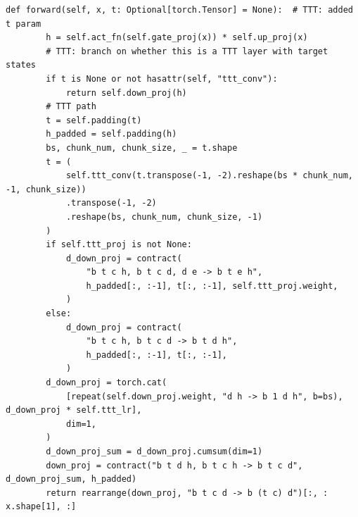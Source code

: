 \begin{lstlisting}[caption={Excerpt from \texttt{repos/\allowbreak{}ByteDance-Seed\_\_In-Place-TTT/\allowbreak{}hf\_models/\allowbreak{}hf\_qwen3/\allowbreak{}modeling\_qwen3.py} (\texttt{Qwen3MLP.forward})},label={lst:c09-inplace-code}]
    def forward(self, x, t: Optional[torch.Tensor] = None):  # TTT: added t param
        h = self.act_fn(self.gate_proj(x)) * self.up_proj(x)
        # TTT: branch on whether this is a TTT layer with target states
        if t is None or not hasattr(self, "ttt_conv"):
            return self.down_proj(h)
        # TTT path
        t = self.padding(t)
        h_padded = self.padding(h)
        bs, chunk_num, chunk_size, _ = t.shape
        t = (
            self.ttt_conv(t.transpose(-1, -2).reshape(bs * chunk_num, -1, chunk_size))
            .transpose(-1, -2)
            .reshape(bs, chunk_num, chunk_size, -1)
        )
        if self.ttt_proj is not None:
            d_down_proj = contract(
                "b t c h, b t c d, d e -> b t e h",
                h_padded[:, :-1], t[:, :-1], self.ttt_proj.weight,
            )
        else:
            d_down_proj = contract(
                "b t c h, b t c d -> b t d h",
                h_padded[:, :-1], t[:, :-1],
            )
        d_down_proj = torch.cat(
            [repeat(self.down_proj.weight, "d h -> b 1 d h", b=bs), d_down_proj * self.ttt_lr],
            dim=1,
        )
        d_down_proj_sum = d_down_proj.cumsum(dim=1)
        down_proj = contract("b t d h, b t c h -> b t c d", d_down_proj_sum, h_padded)
        return rearrange(down_proj, "b t c d -> b (t c) d")[:, : x.shape[1], :]
\end{lstlisting}

